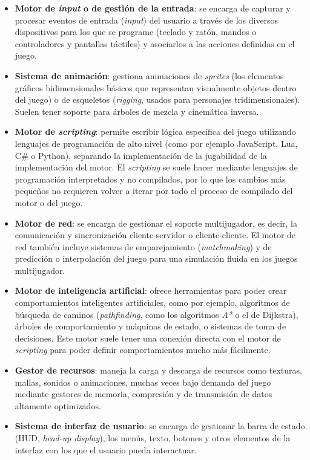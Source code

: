\begin{itemize}
\item \textbf{Motor de \textit{input} o de gestión de la entrada}: se encarga de capturar y procesar eventos de entrada (\textit{input}) del usuario a través de los diversos dispositivos para los que se programe (teclado y ratón, mandos o controladores y pantallas táctiles) y asociarlos a las acciones definidas en el juego.
\item \textbf{Sistema de animación}: gestiona animaciones de \textit{sprites} (los elementos gráficos bidimensionales básicos que representan visualmente objetos dentro del juego) o de esqueletos (\textit{rigging}, usados para personajes tridimensionales). Suelen tener soporte para árboles de mezcla y cinemática inversa.
\item \textbf{Motor de \textit{scripting}}: permite escribir lógica específica del juego utilizando lenguajes de programación de alto nivel (como por ejemplo JavaScript, Lua, C\# o Python), separando la implementación de la jugabilidad de la implementación del motor. El \textit{scripting} se suele hacer mediante lenguajes de programación interpretados y no compilados, por lo que los cambios más pequeños no requieren volver a iterar por todo el proceso de compilado del motor o del juego.
\item \textbf{Motor de red}: se encarga de gestionar el soporte multijugador, es decir, la comunicación y sincronización cliente-servidor o cliente-cliente. El motor de red también incluye sistemas de emparejamiento (\textit{matchmaking}) y de predicción o interpolación del juego para una simulación fluida en los juegos multijugador.
\item \textbf{Motor de inteligencia artificial}: ofrece herramientas para poder crear comportamientos inteligentes artificiales, como por ejemplo, algoritmos de búsqueda de caminos (\textit{pathfinding}, como los algoritmos \textit{A*} o el de Dijkstra), árboles de comportamiento y máquinas de estado, o sistemas de toma de decisiones. Este motor suele tener una conexión directa con el motor de \textit{scripting} para poder definir comportamientos mucho más fácilmente.
\item \textbf{Gestor de recursos}: maneja la carga y descarga de recursos como texturas, mallas, sonidos o animaciones, muchas veces bajo demanda del juego mediante gestores de memoria, compresión y de transmisión de datos altamente optimizados.
\item \textbf{Sistema de interfaz de usuario}: se encarga de gestionar la barra de estado (HUD, \textit{head-up display}), los menús, texto, botones y otros elementos de la interfaz con los que el usuario pueda interactuar.
\end{itemize}

